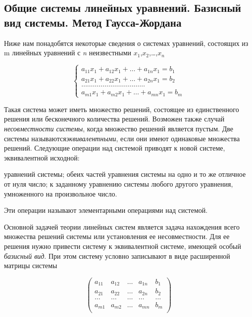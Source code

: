 \documentclass{article}
\begin{document}
\subsection{Общие системы линейных уравнений. Базисный вид системы. Метод Гаусса-Жордана}
Ниже нам понадобятся некоторые сведения о системах уравнений, состоящих из m линейных уравнений с \textit {n} неизвестными $x_1$,$x_2$,\dots,$x_\textit{n}$%

\begin{equation*}
\begin{cases}
a_{11}x_1 + a_{12}x_1 + \dots + a_{1n}x_1 =b_1\\
a_{21}x_1 + a_{22}x_1 + \dots + a_{2n}x_1 =b_2\\
\dots\dots\dots\dots\dots\dots\dots\dots\dots\dots\dots\\
a_{m1}x_1 + a_{m2}x_1 + \dots + a_{mn}x_1 =b_m
\end{cases}
\end{equation*}

Такая система может иметь множество решений, состоящее из единственного решения или бесконечного количества решений. Возможен также случай \textit{несовместности системы}, когда множество решений является пустым. Две системы называются\textit {эквивалентными}, если они имеют одинаковые множества решений. Следующие операции над системой приводят к новой системе, эквивалентной исходной:
		\begin{enumerate}
			\renewcommand{\theenumi}{(\arabic{enumi})}
			\renewcommand{\labelenumi}{\arabic{enumi})}
			 уравнений системы;
			 обеих частей уравнения системы на одно и то же отличное от нуля число;
			 к заданному уравнению системы любого другого уравнения, умноженного на произвольное число.
		\end{enumerate}
Эти операции называют элементарными операциями над системой.

Основной задачей теории линейных систем является задача нахождения всего множества решений системы или установления ее несовместности. Для ее решения нужно привести систему к эквивалентной системе, имеющей особый \textit{базисный вид}. При этом систему условно записывают в виде расширенной матрицы системы

$$\left(\begin{array}{rrrr|r} 
a_{11}&a_{12}&\dots&a_{1n}&b_1\\
a_{21}&a_{22}&\dots&a_{2n}&b_2\\
\dots&\dots&\dots&\dots&\dots\\
a_{m1}&a_{m2}&\dots&a_{mn}&b_m\\ 
\end{array}\right)$$
\end{document}
